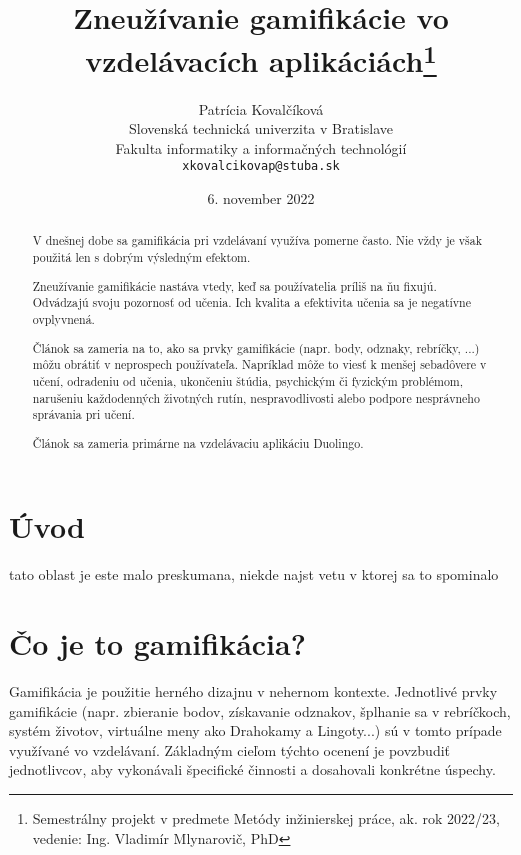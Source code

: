\documentclass[10pt,twoside,slovak,a4paper]{article}
\title{Zneužívanie gamifikácie vo vzdelávacích aplikáciách\thanks{Semestrálny projekt v predmete Metódy inžinierskej práce, ak. rok 2022/23, vedenie: Ing. Vladimír Mlynarovič, PhD}}
\author{Patrícia Kovalčíková\\[2pt]
	{\small Slovenská technická univerzita v Bratislave}\\
	{\small Fakulta informatiky a informačných technológií}\\
	{\small \texttt{xkovalcikovap@stuba.sk}}
	}
\date{\small 6. november 2022}
\begin{document}
\maketitle

\begin{abstract}
V dnešnej dobe sa gamifikácia pri vzdelávaní využíva pomerne často. Nie vždy je však použitá len s dobrým výsledným efektom. 

Zneužívanie gamifikácie nastáva vtedy, keď sa používatelia príliš na ňu fixujú\cite{HadiMogavi2022}. Odvádzajú svoju pozornosť od učenia. Ich kvalita a efektivita učenia sa je negatívne ovplyvnená.

Článok sa zameria na to, ako sa prvky gamifikácie (napr. body, odznaky, rebríčky, ...) môžu obrátiť v neprospech používateľa. Napríklad môže to viesť k menšej sebadôvere v učení, odradeniu od učenia, ukončeniu štúdia, psychickým či fyzickým problémom, narušeniu každodenných životných rutín, nespravodlivosti alebo podpore nesprávneho správania pri učení\cite{HadiMogavi2022}. 

Článok sa zameria primárne na vzdelávaciu aplikáciu Duolingo. 

\end{abstract}



\section{Úvod}
tato oblast je este malo preskumana, niekde najst vetu v ktorej sa to spominalo


%
%



\section{Čo je to gamifikácia?} \label{Čo je to gamifikácia?}


Gamifikácia je použitie herného dizajnu v nehernom kontexte\cite{Definition}. Jednotlivé prvky gamifikácie (napr. zbieranie bodov, získavanie odznakov, šplhanie sa v rebríčkoch, systém životov, virtuálne meny ako Drahokamy a Lingoty...) sú v tomto prípade využívané vo vzdelávaní. Základným cieľom týchto ocenení je povzbudiť jednotlivcov, aby vykonávali špecifické činnosti a dosahovali konkrétne úspechy\cite{Definition}.
\end{document}
